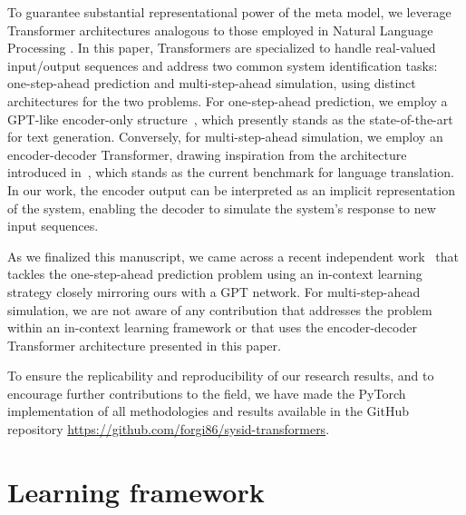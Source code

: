 \documentclass{article}
\begin{document}
To guarantee substantial representational power of the meta model, we leverage Transformer architectures analogous to those employed in Natural Language Processing \cite{vaswani2017attention,radford2019language}. In this paper, Transformers are specialized to handle real-valued input/output sequences and address two common  system identification tasks: one-step-ahead prediction and multi-step-ahead simulation, using distinct architectures for the two problems. For one-step-ahead prediction, we employ a GPT-like encoder-only structure~\cite{radford2019language}, which presently stands as the state-of-the-art for 
text generation.   Conversely, for multi-step-ahead simulation, we employ an encoder-decoder Transformer, drawing inspiration from the  architecture introduced in~\cite{vaswani2017attention}, which stands as the current benchmark for language translation. In our work, the encoder output can be interpreted as an implicit representation of the  system, enabling the decoder to simulate the system’s response to new input sequences. 

 
As we finalized this manuscript, we came across a recent independent work~\cite{balim2023can} that tackles the  one-step-ahead prediction problem using an in-context learning strategy closely mirroring ours with a GPT network. For multi-step-ahead simulation, we are not aware of any contribution that addresses the problem within an in-context learning framework or that uses the encoder-decoder Transformer architecture presented in this paper.

To ensure the replicability and reproducibility of our research results, and to encourage further contributions to the field, we have made the PyTorch implementation of all methodologies and results available in the GitHub repository \href{https://github.com/forgi86/sysid-transformers}{https://github.com/forgi86/sysid-transformers}. 

 

 
\section{Learning framework}

\end{document}
